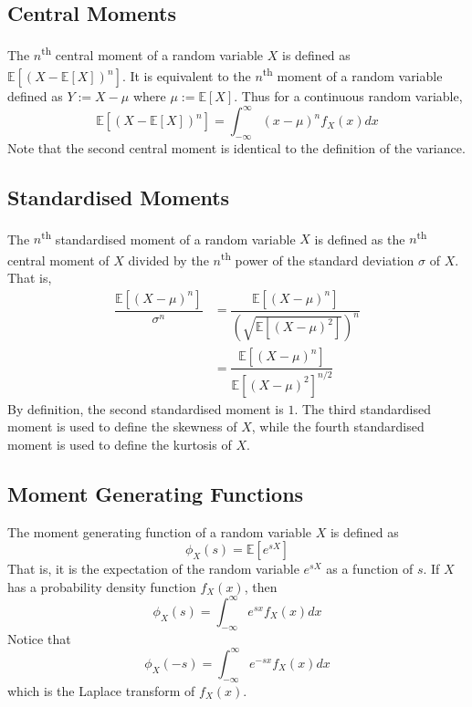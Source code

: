 \documentclass[11pt]{report} %
\begin{document}
\subsection{Central Moments}

The $n$\textsuperscript{th} central moment of a random variable $X$ is defined as $\mathbb{E}\left[\left(X - \mathbb{E}\left[X\right]\right)^{n}\right]$. It is equivalent to the $n$\textsuperscript{th} moment of a random variable defined as $Y := X - \mu$ where $\mu := \mathbb{E}\left[X\right]$. Thus for a continuous random variable,
\begin{equation}
\mathbb{E}\left[\left(X - \mathbb{E}\left[X\right]\right)^{n}\right] = \int_{-\infty}^{\infty}\left(x - \mu\right)^{n}f_{X}\left(x\right)dx
\end{equation}
Note that the second central moment is identical to the definition of the variance.

\subsection{Standardised Moments}

The $n$\textsuperscript{th} standardised moment of a random variable $X$ is defined as the $n$\textsuperscript{th} central moment of $X$ divided by the $n$\textsuperscript{th} power of the standard deviation $\sigma$ of $X$. That is,
\begin{align}
\dfrac{\mathbb{E}\left[\left(X - \mu\right)^{n}\right]}{\sigma^{n}} &= \dfrac{\mathbb{E}\left[\left(X - \mu\right)^{n}\right]}{\left(\sqrt{\mathbb{E}\left[\left(X - \mu\right)^{2}\right]}\right)^{n}} \\
&= \dfrac{\mathbb{E}\left[\left(X - \mu\right)^{n}\right]}{\mathbb{E}\left[\left(X - \mu\right)^{2}\right]^{n/2}}
\end{align}
By definition, the second standardised moment is $1$. The third standardised moment is used to define the skewness of $X$, while the fourth standardised moment is used to define the kurtosis of $X$.

\subsection{Moment Generating Functions}

The moment generating function of a random variable $X$ is defined as
\begin{equation}
\phi_{X}\left(s\right) = \mathbb{E}\left[e^{sX}\right]
\end{equation}
That is, it is the expectation of the random variable $e^{sX}$ as a function of $s$. If $X$ has a probability density function $f_{X}\left(x\right)$, then
\begin{equation}
\phi_{X}\left(s\right) = \int_{-\infty}^{\infty}e^{sx}f_{X}\left(x\right)dx
\end{equation}
Notice that
\begin{equation}
\phi_{X}\left(-s\right) = \int_{-\infty}^{\infty}e^{-sx}f_{X}\left(x\right)dx
\end{equation}
which is the Laplace transform of $f_{X}\left(x\right)$. \\
\end{document}
